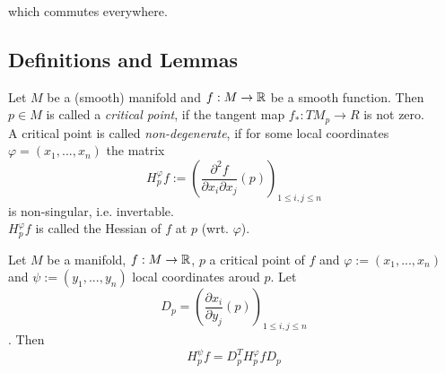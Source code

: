 \documentclass[a4paper,11pt]{article}
\begin{document}
which commutes everywhere.

\subsection{Definitions and Lemmas}

\begin{definition}
   \label{def:critical point}

   Let $M$ be a (smooth) manifold and $f: M \rightarrow {\mathbb R}$ be a smooth 
   function. Then $p \in M$ is called a \textit{critical point}, if the 
   tangent map $f_*: TM_p \rightarrow R$ is not zero. \\
   A critical point is called \textit{non-degenerate}, if for some local 
   coordinates $\varphi = (x_1, ..., x_n)$
   the matrix 
   \[ H_p^{\varphi}f := 
   \left(\frac{\partial^2 f}{\partial x_i \partial x_j}(p)\right)_{1 \leq i,j \leq n} \]
   is non-singular, i.e. invertable. \\
   $H_p^{\varphi}f$ is called the Hessian of $f$ at $p$ (wrt. $\varphi$).

\end{definition}

\begin{lemma}
   \label{lemma:congruency}   

   Let $M$ be a manifold, $f: M \rightarrow {\mathbb R}$, $p$ a critical point of $f$
   and $\varphi := (x_1, ..., x_n)$ and $\psi := (y_1, ..., y_n)$ local 
   coordinates aroud $p$. Let 
   \[ D_p = \left( \frac{\partial x_i}{\partial y_j}(p) \right)_{1 \leq i, j \leq n}\].
   Then 
   \[ H_p^{\psi}f = D_p^T H_p^{\varphi}f D_p \]

\end{lemma}
\end{document}
